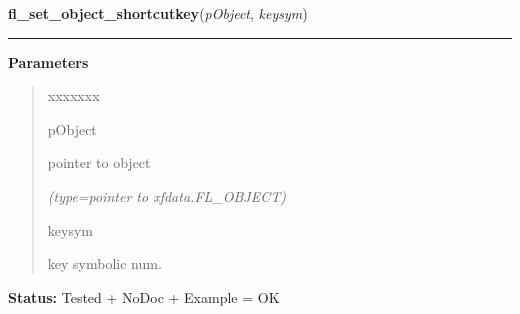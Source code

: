 \hspace{.8\funcindent}\begin{boxedminipage}{\funcwidth}

    \raggedright \textbf{fl\_set\_object\_shortcutkey}(\textit{pObject}, \textit{keysym})

    \vspace{-1.5ex}

    \rule{\textwidth}{0.5\fboxrule}
\setlength{\parskip}{2ex}
\setlength{\parskip}{1ex}
      \textbf{Parameters}
      \vspace{-1ex}

      \begin{quote}
        \begin{Ventry}{xxxxxxx}

          \item[pObject]

          pointer to object

            {\it (type=pointer to xfdata.FL\_OBJECT)}

          \item[keysym]

          key symbolic num.

        \end{Ventry}

      \end{quote}

\textbf{Status:} Tested + NoDoc + Example = OK



    \end{boxedminipage}

    \label{xformslib:library:fl_set_object_dblbuffer}

    \vspace{0.5ex}

